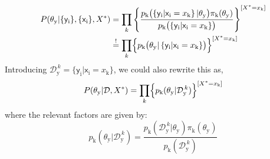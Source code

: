 \documentclass[]{report}
\begin{document}
\begin{align}
P( \theta_\mathrm{y} | \{ \mathsf{y}_\mathrm{i} \}, \{ \mathsf{x}_\mathrm{i} \}, X^*) 
&=
\prod_{k}
	\left\{
		\frac
			{
				p_\mathrm{k}
					\bigl(
						\left\{ 
							\mathsf{y}_\mathrm{i} | 
							\mathsf{x}_\mathrm{i} = x_\mathrm{k}
						\right\} |
						\theta_\mathrm{y}
					\bigr)
				\pi_\mathrm{k}( \theta_\mathrm{y} )
			}
			{
				p_\mathrm{k}
					\bigl(
						\left\{
							\mathsf{y}_\mathrm{i} | 
							\mathsf{x}_\mathrm{i} = x_\mathrm{k}
						\right\} 
					\bigr)
			}
	\right\}
	^
	{
		[ X^* = x_\mathrm{k} ]
	}
\nonumber \\
&\stackrel{!}{=}
\prod_{k}
	\Bigl\{
		p_\mathrm{k}
			\bigl(
				\theta_\mathrm{y} |
				\left\{
					\mathsf{y}_\mathrm{i} |
					\mathsf{x}_\mathrm{i} = x_\mathrm{k}
				\right\}
			\bigr)
	\Bigr\}
	^
	{
		[ X^* = x_\mathrm{k} ]
	} 
\end{align}
Introducing $\mathcal{D}_\mathrm{y}^{\,k} = \{ \mathsf{y}_\mathrm{i} | \mathsf{x}_\mathrm{i} = x_\mathrm{k} \} $, we could also rewrite this as,
\begin{equation}
P( \theta_\mathrm{y} | \mathcal{D}, X^* ) 
=
\prod_{k}
	\Bigl\{
		p_\mathrm{k}
			(
				\theta_\mathrm{y} |
				\mathcal{D}_\mathrm{y}^{\,k} 
			)
	\Bigr\}
	^
	{
		[ X^* = x_\mathrm{k} ]
	}
\end{equation}
where the relevant factors are given by:
\begin{equation}
p_\mathrm{k}( \theta_\mathrm{y} | \mathcal{D}_\mathrm{y}^{\,k} ) 
=
\frac
	{
		p_\mathrm{k}
			(
				\mathcal{D}_\mathrm{y}^{\,k} |
				\theta_\mathrm{y}
			)
		\pi_\mathrm{k}( \theta_\mathrm{y} )
	}
	{
		p_\mathrm{k}( \mathcal{D}_\mathrm{y}^{\,k} )
	}
\end{equation}
\end{document}
